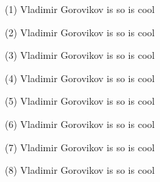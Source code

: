 \documentclass{article}%
\begin{document}
%
\normalsize%
\pagestyle{empty}%
\noindent%
\begin{minipage}{0.3333333333333333\textwidth}%
(1) Vladimir Gorovikov%
\newline%
%
is so%
\newline%
%
is cool%
\newline%
%
\end{minipage}%
\begin{minipage}{0.3333333333333333\textwidth}%
(2) Vladimir Gorovikov%
\newline%
%
is so%
\newline%
%
is cool%
\newline%
%
\end{minipage}%
\begin{minipage}{0.3333333333333333\textwidth}%
(3) Vladimir Gorovikov%
\newline%
%
is so%
\newline%
%
is cool%
\newline%
%
\end{minipage}%
\newline%
\begin{minipage}{0.3333333333333333\textwidth}%
(4) Vladimir Gorovikov%
\newline%
%
is so%
\newline%
%
is cool%
\newline%
%
\end{minipage}%
\begin{minipage}{0.3333333333333333\textwidth}%
(5) Vladimir Gorovikov%
\newline%
%
is so%
\newline%
%
is cool%
\newline%
%
\end{minipage}%
\begin{minipage}{0.3333333333333333\textwidth}%
(6) Vladimir Gorovikov%
\newline%
%
is so%
\newline%
%
is cool%
\newline%
%
\end{minipage}%
\newline%
\begin{minipage}{0.3333333333333333\textwidth}%
(7) Vladimir Gorovikov%
\newline%
%
is so%
\newline%
%
is cool%
\newline%
%
\end{minipage}%
\begin{minipage}{0.3333333333333333\textwidth}%
(8) Vladimir Gorovikov%
\newline%
%
is so%
\newline%
%
is cool%
\newline%
%
\end{minipage}%
\end{document}
